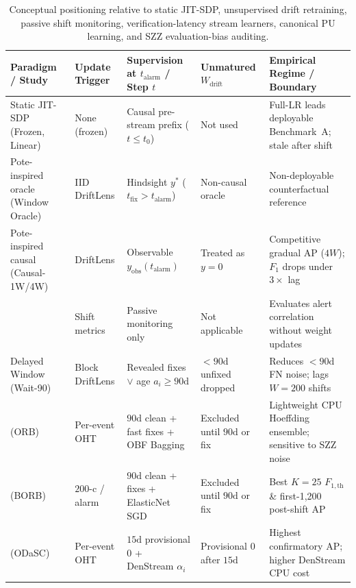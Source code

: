 \documentclass[10pt,a4paper]{article}
\renewcommand{\arraystretch}{1.08}
\begin{document}
\begin{table}[!htbp]
\centering
\caption{Conceptual positioning relative to static JIT-SDP, unsupervised drift retraining, passive shift monitoring, verification-latency stream learners, canonical PU learning, and SZZ evaluation-bias auditing.}
\label{tab:positioning}
\fontsize{7.5}{9.0}\selectfont
\renewcommand{\arraystretch}{1.05}
\setlength{\tabcolsep}{2.4pt}
\begin{tabularx}{\textwidth}{L{3.1cm}L{2.1cm}Y L{2.8cm}L{3.6cm}}
\toprule
\textbf{Paradigm / Study} & \textbf{Update Trigger} & \textbf{Supervision at $t_{\text{alarm}}$ / Step $t$} & \textbf{Unmatured $W_{\text{drift}}$} & \textbf{Empirical Regime / Boundary} \\
\midrule
Static JIT-SDP \citep{kamei2013large,hoang2019deepjit,feng2020codebert,zeng2021deep} (Frozen, Linear) & None (frozen) & Causal pre-stream prefix ($t \le t_0$) & Not used & Full-LR leads deployable Benchmark~A; stale after shift \\
Pote-inspired oracle \citep{pote2026adaptive} (Window Oracle) & IID DriftLens & Hindsight $y^*$ ($t_{\text{fix}} > t_{\text{alarm}}$) & Non-causal oracle & Non-deployable counterfactual reference \\
Pote-inspired causal \citep{pote2026adaptive} (Causal-1W/4W) & DriftLens & Observable $y_{\text{obs}}(t_{\text{alarm}})$ & Treated as $y=0$ & Competitive gradual AP ($4W$); $F_1$ drops under $3\times$ lag \\
\citet{shah2026detecting} & Shift metrics & Passive monitoring only & Not applicable & Evaluates alert correlation without weight updates \\
Delayed Window (Wait-90) & Block DriftLens & Revealed fixes $\vee$ age $a_i \ge 90\text{d}$ & $<90\text{d}$ unfixed dropped & Reduces $<90\text{d}$ FN noise; lags $W=200$ shifts \\
\citet{cabral2019class} (ORB) & Per-event OHT & $90\text{d}$ clean + fast fixes + OBF Bagging & Excluded until $90\text{d}$ or fix & Lightweight CPU Hoeffding ensemble; sensitive to SZZ noise \\
\citet{cabral2023borb} (BORB) & $200$-c / alarm & $90\text{d}$ clean + fixes + ElasticNet SGD & Excluded until $90\text{d}$ or fix & Best $K=25$ $F_{1,\text{th}}$ \& first-1,200 post-shift AP \\
\citet{song2022odasc} (ODaSC) & Per-event OHT & $15\text{d}$ provisional $0$ + DenStream $\alpha_i$ & Provisional $0$ after $15\text{d}$ & Highest confirmatory AP; higher DenStream CPU cost \\

\end{tabularx}
\end{table}
\end{document}
